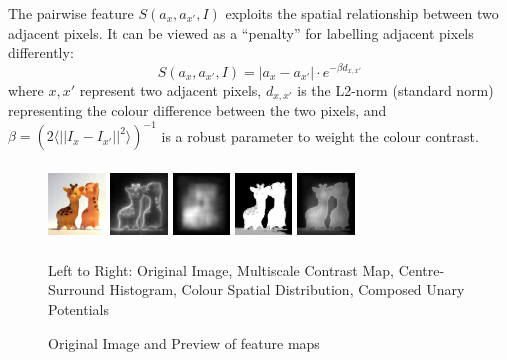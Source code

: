 \documentclass[10pt,twocolumn,letterpaper]{article}
\begin{document}
The pairwise feature $S(a_x,a_{x'},I)$ exploits the spatial relationship between two adjacent pixels.  It can be viewed as a ``penalty'' for labelling adjacent pixels differently: $$S(a_x,a_{x'},I) = |a_x-a_{x'}| \cdot e^{-\beta d_{x,x'}}$$ where $x,x'$ represent two adjacent pixels, $d_{x,x'}$ is the L2-norm (standard norm) representing the colour difference between the two pixels, and $\beta=(2\langle||I_x-I_{x'}||^2\rangle)^{-1}$ is a robust parameter to weight the colour contrast.

\begin{figure}[h]
    \begin{center} %
    \includegraphics[width=0.6in,height=0.8in]{./Figures/previews/raw.jpg}
    \includegraphics[width=0.6in,height=0.8in]{./Figures/previews/MC.jpg}
    \includegraphics[width=0.6in,height=0.8in]{./Figures/previews/CSH.jpg} 
    \includegraphics[width=0.6in,height=0.8in]{./Figures/previews/CSD.jpg} 
    \includegraphics[width=0.6in,height=0.8in]{./Figures/previews/Composed.jpg} \\
    \caption{Original Image and Preview of feature maps}\vspace{1mm}
       \small Left to Right: Original Image, Multiscale Contrast Map, Centre-Surround Histogram, Colour Spatial Distribution, Composed Unary Potentials
\end{center}
\end{figure}
\end{document}
